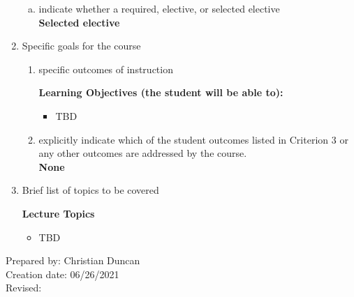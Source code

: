 \begin{enumerate}[1.]
\begin{enumerate}[a.]
\item indicate whether a required, elective, or selected elective\\ %
  {\bfseries
    Selected elective
  }

\end{enumerate}

\item Specific goals for the course
\begin{enumerate}
\item specific outcomes of instruction\\ %
  {\bfseries
    Learning Objectives (the student will be able to):
    \begin{itemize}
      \item TBD
    \end{itemize}
  }

\item explicitly indicate which of the student outcomes listed in Criterion 3 or any other outcomes are addressed by the course.\\
  {\bfseries
    None
  }
\end{enumerate}

\item Brief list of topics to be covered\\
  {\bfseries
    Lecture Topics
    \begin{itemize}
      \item TBD
    \end{itemize}
  }

\end{enumerate}

\noindent Prepared by: Christian Duncan\\
\noindent Creation date: 06/26/2021\\
\noindent Revised:\\
